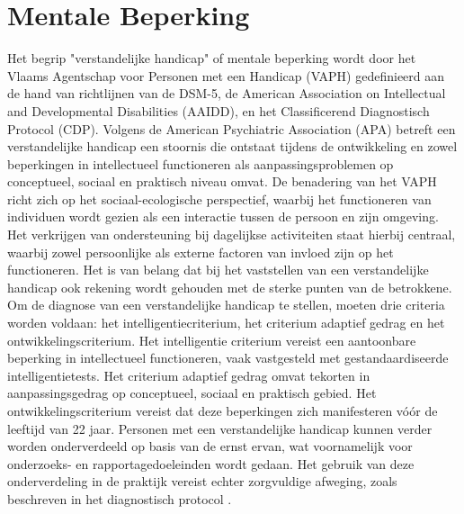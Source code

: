 \section{Mentale Beperking}
\label{sec:mentale beperking}
Het begrip "verstandelijke handicap" of mentale beperking wordt door het Vlaams Agentschap voor Personen met een Handicap (VAPH) gedefinieerd aan de hand van richtlijnen van de DSM-5, de American Association on Intellectual and Developmental Disabilities (AAIDD), en het Classificerend Diagnostisch Protocol (CDP). Volgens de American Psychiatric Association (APA) betreft een verstandelijke handicap een stoornis die ontstaat tijdens de ontwikkeling en zowel beperkingen in intellectueel functioneren als aanpassingsproblemen op conceptueel, sociaal en praktisch niveau omvat. De benadering van het VAPH richt zich op het sociaal-ecologische perspectief, waarbij het functioneren van individuen wordt gezien als een interactie tussen de persoon en zijn omgeving. Het verkrijgen van ondersteuning bij dagelijkse activiteiten staat hierbij centraal, waarbij zowel persoonlijke als externe factoren van invloed zijn op het functioneren. Het is van belang dat bij het vaststellen van een verstandelijke handicap ook rekening wordt gehouden met de sterke punten van de betrokkene. Om de diagnose van een verstandelijke handicap te stellen, moeten drie criteria worden voldaan: het intelligentiecriterium, het criterium adaptief gedrag en het ontwikkelingscriterium. Het intelligentie criterium vereist een aantoonbare beperking in intellectueel functioneren, vaak vastgesteld met gestandaardiseerde intelligentietests. Het criterium adaptief gedrag omvat tekorten in aanpassingsgedrag op conceptueel, sociaal en praktisch gebied. Het ontwikkelingscriterium vereist dat deze beperkingen zich manifesteren vóór de leeftijd van 22 jaar. Personen met een verstandelijke handicap kunnen verder worden onderverdeeld op basis van de ernst ervan, wat voornamelijk voor onderzoeks- en rapportagedoeleinden wordt gedaan. Het gebruik van deze onderverdeling in de praktijk vereist echter zorgvuldige afweging, zoals beschreven in het diagnostisch protocol \autocite{VAPH}.
